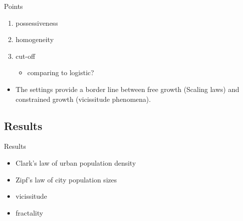 \documentclass{beamer}
\begin{document}
\begin{frame}{Points}
  \begin{enumerate}
    \item possessiveness
    \item homogeneity
    \item cut-off
    \begin{itemize}
    \item comparing to logistic?
    \end{itemize}
  \end{enumerate}
  \vspace{1cm}
  \begin{itemize}
    \item The settings provide a border line between free growth (Scaling laws) and constrained growth (vicissitude phenomena).
  \end{itemize}

\end{frame}

\subsection{Results}
\begin{frame}{Results}
  \begin{itemize}
    \item Clark's law of urban population density
    \item Zipf's law of city population sizes
    \item vicissitude
    \item fractality
  \end{itemize}
\end{frame}
\end{document}

